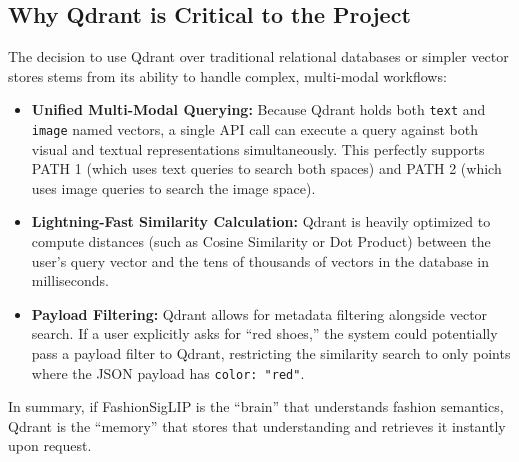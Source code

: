 \subsection{Why Qdrant is Critical to the Project}
The decision to use Qdrant over traditional relational databases or simpler vector stores stems from its ability to handle complex, multi-modal workflows:

\begin{itemize}
    \item \textbf{Unified Multi-Modal Querying:} Because Qdrant holds both \texttt{text} and \texttt{image} named vectors, a single API call can execute a query against both visual and textual representations simultaneously. This perfectly supports PATH 1 (which uses text queries to search both spaces) and PATH 2 (which uses image queries to search the image space).
    \item \textbf{Lightning-Fast Similarity Calculation:} Qdrant is heavily optimized to compute distances (such as Cosine Similarity or Dot Product) between the user's query vector and the tens of thousands of vectors in the database in milliseconds.
    \item \textbf{Payload Filtering:} Qdrant allows for metadata filtering alongside vector search. If a user explicitly asks for ``red shoes,'' the system could potentially pass a payload filter to Qdrant, restricting the similarity search to only points where the JSON payload has \texttt{color: "red"}.
\end{itemize}

In summary, if FashionSigLIP is the ``brain'' that understands fashion semantics, Qdrant is the ``memory'' that stores that understanding and retrieves it instantly upon request.

